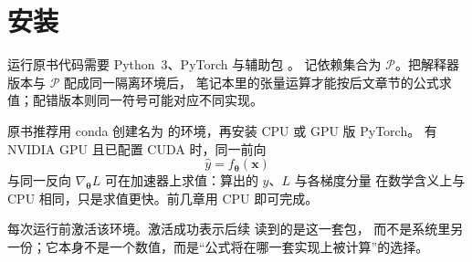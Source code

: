 \chapter*{安装}

运行原书代码需要 Python~3、PyTorch 与辅助包 。
记依赖集合为 $\mathcal{P}$。把解释器版本与 $\mathcal{P}$ 配成同一隔离环境后，
笔记本里的张量运算才能按后文章节的公式求值；配错版本则同一符号可能对应不同实现。

原书推荐用 conda 创建名为  的环境，再安装 CPU 或 GPU 版 PyTorch。
有 NVIDIA GPU 且已配置 CUDA 时，同一前向
\[
\hat{y}=f_{\bm{\theta}}(\bm{x})
\]
与同一反向 $\nabla_{\bm{\theta}}L$ 可在加速器上求值：算出的 $\hat{y}$、$L$ 与各梯度分量
在数学含义上与 CPU 相同，只是求值更快。前几章用 CPU 即可完成。

每次运行前激活该环境。激活成功表示后续  读到的是这一套包，
而不是系统里另一份；它本身不是一个数值，而是“公式将在哪一套实现上被计算”的选择。
